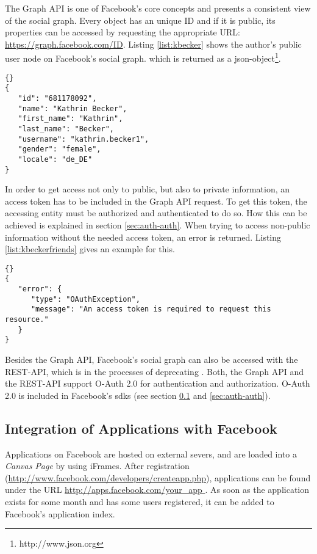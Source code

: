 \documentclass[preprint,12pt]{elsarticle}
\begin{document}
The Graph API is one of Facebook's core concepts and presents a consistent
view of the social graph. Every object has an unique ID and if it is
public, its properties can be accessed by requesting the appropriate URL:
\url{https://graph.facebook.com/ID}. Listing \ref{list:kbecker} shows
the author's public user node on Facebook's social graph. which is
returned as a \ac{json}-object\footnote{http://www.json.org}.

\begin{lstlisting}[caption=JSON object from
  \url{https://graph.facebook.com/681178092},
  label=list:kbecker]{}
{
   "id": "681178092",
   "name": "Kathrin Becker",
   "first_name": "Kathrin",
   "last_name": "Becker",
   "username": "kathrin.becker1",
   "gender": "female",
   "locale": "de_DE"
}
\end{lstlisting}

In order to get access not only to public, but also to private
information, an access token has to be included in the Graph API
request. To get this token, the accessing entity must be
authorized and authenticated to do so. How this can be achieved is
explained in section \ref{sec:auth-auth}. When trying to access
non-public information without the needed access token, an error
is returned. Listing \ref{list:kbeckerfriends} gives an example for this.


\begin{lstlisting}[caption=JSON object from
  \url{https://graph.facebook.com/681178092/friends},
  label=list:kbeckerfriends]{}
{
   "error": {
      "type": "OAuthException",
      "message": "An access token is required to request this resource."
   }
}
\end{lstlisting}


Besides the Graph API, Facebook's social graph can also be accessed
with the REST-API, which is in the processes of deprecating
\cite{facebookDev3}. Both, the Graph API and the REST-API support
O-Auth 2.0 for authentication and authorization. O-Auth 2.0 is
included in Facebook's \ac{sdks} (see section
\ref{sec:integr-appl-with} and \ref{sec:auth-auth}).




\subsection{Integration of Applications with Facebook}
\label{sec:integr-appl-with}
Applications on Facebook are hosted on external severs, and are loaded
into a \textit{Canvas Page} by using iFrames. After registration
(\url{http://www.facebook.com/developers/createapp.php}), applications
can be found under the URL \url{http://apps.facebook.com/your_app }.
As soon as the application exists for some month and has
some users registered, it can be added to Facebook's application
index. 
\end{document}
